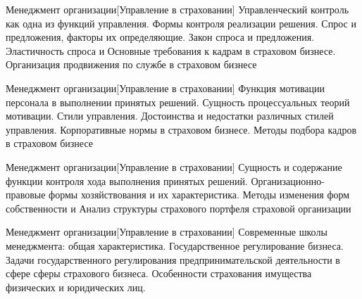 \documentclass[
	11pt,
	a4paper,
	]
	{article}
\begin{document}
\vfill



\begin{minipage}[t][\miniH]{\miniL}\centering
	 {Менеджмент организации}[Управление в страховании]
		{
			Управленческий контроль как одна из функций управления. Формы контроля реализации решения.
		}{
			Спрос и предложения, факторы их определяющие. Закон спроса и предложения. Эластичность спроса и
		}{
			Основные требования к кадрам в страховом бизнесе. Организация продвижения по службе в страховом бизнесе
		}
	\lowGE
\end{minipage}





\begin{minipage}[t][\miniH]{\miniL}\centering
	 {Менеджмент организации}[Управление в страховании]
		{
			Функция мотивации персонала в выполнении принятых решений. Сущность процессуальных теорий мотивации.
		}{
			Стили управления. Достоинства и недостатки различных стилей управления.
		}{
			Корпоративные нормы в страховом бизнесе. Методы подбора кадров в страховом бизнесе
		}
	\lowGE
\end{minipage}

\vfill



\begin{minipage}[t][\miniH]{\miniL}\centering
	 {Менеджмент организации}[Управление в страховании]
		{
			Сущность и содержание функции контроля хода выполнения принятых решений.
		}{
			Организационно-правовые формы хозяйствования и их характеристика. Методы изменения форм собственности и
		}{
			Анализ структуры страхового портфеля страховой организации
		}
	\lowGE
\end{minipage}

\vfill



\begin{minipage}[t][\miniH]{\miniL}\centering
	 {Менеджмент организации}[Управление в страховании]
		{
			Современные школы менеджмента: общая характеристика.
		}{
			Государственное регулирование бизнеса. Задачи государственного регулирования предпринимательской деятельности в сфере сферы страхового бизнеса.
		}{
			Особенности страхования имущества физических и юридических лиц.
		}
	\lowGE
\end{minipage}
\end{document}
